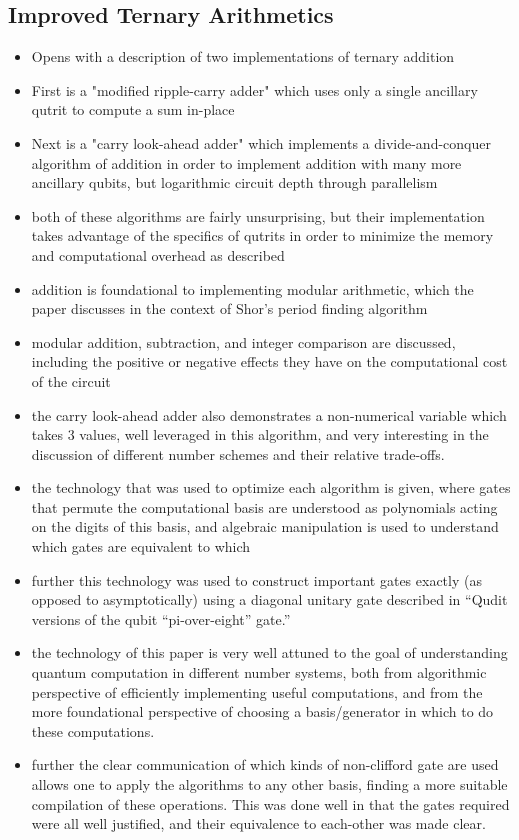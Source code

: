 \subsection{Improved Ternary Arithmetics}
\begin{itemize}
	\item Opens with a description of two implementations of ternary addition
	\item First is a "modified ripple-carry adder" which uses only a single ancillary qutrit to compute a sum in-place
	\item Next is a "carry look-ahead adder" which implements a divide-and-conquer algorithm of addition in order to implement addition with many more ancillary qubits, but logarithmic circuit depth through parallelism
	\item both of these algorithms are fairly unsurprising, but their implementation takes advantage of the specifics of qutrits in order to minimize the memory and computational overhead as described
	\item addition is foundational to implementing modular arithmetic, which the paper discusses in the context of Shor's period finding algorithm
	\item modular addition, subtraction, and integer comparison are discussed, including the positive or negative effects they have on the computational cost of the circuit
	\item the carry look-ahead adder also demonstrates a non-numerical variable which takes 3 values, well leveraged in this algorithm, and very interesting in the discussion of different number schemes and their relative trade-offs.
	\item the technology that was used to optimize each algorithm is given, where gates that permute the computational basis are understood as polynomials acting on the digits of this basis, and algebraic manipulation is used to understand which gates are equivalent to which
	\item further this technology was used to construct important gates exactly (as opposed to asymptotically) using a diagonal unitary gate described in ``Qudit versions of the qubit ``pi-over-eight'' gate.''
	\item the technology of this paper is very well attuned to the goal of understanding quantum computation in different number systems, both from algorithmic perspective of efficiently implementing useful computations, and from the more foundational perspective of choosing a basis/generator in which to do these computations.
	\item further the clear communication of which kinds of non-clifford gate are used allows one to apply the algorithms to any other basis, finding a more suitable compilation of these operations. This was done well in that the gates required were all well justified, and their equivalence to each-other was made clear.
\end{itemize}


